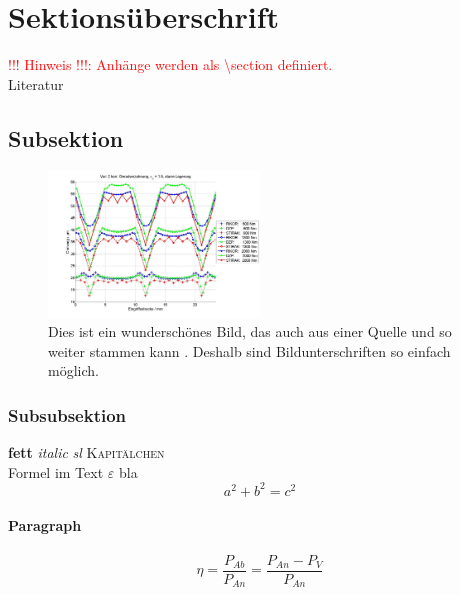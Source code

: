\section{Sektionsüberschrift}
\label{sec:Anochmalsektion}
\textcolor{red}{!!! Hinweis !!!: Anhänge werden als \textbackslash section definiert.}\\
%
Literatur \cite{DIN3990} \cite{testweb}
%
\subsection{Subsektion}
\label{sec:Asubsektion}
%
\begin{figure}
	\centering
	\includegraphics[width=0.5\textwidth]{_ltx/Beispiel.jpg}
	\caption{Dies ist ein wunderschönes Bild, das auch aus einer Quelle und so weiter stammen kann \cite{Niemann01}. Deshalb sind Bildunterschriften so einfach möglich.}
	\label{fig:Abeispiel}
\end{figure}
%
\subsubsection{Subsubsektion}
\label{sec:Asubsubsektion}
%
\textbf{fett} \textit{italic} \textsl{sl} \textsc{Kapitälchen}\\
Formel im Text $\varepsilon$ bla
\begin{equation}
	a^2 + b^2 = c^2
	\label{eq:pytagoras}
	\end{equation}
%
\begin{Gleichungsparameter}
\end{Gleichungsparameter}
%
\paragraph{Paragraph}
\label{sec:paragraph}
%
\begin{equation}
	\eta = \dfrac{P_{Ab}}{P_{An}} = \dfrac{P_{An}-P_{V}}{P_{An}}
\end{equation}
%
\begin{Gleichungsparameter}
\end{Gleichungsparameter}


